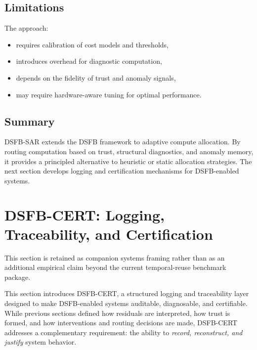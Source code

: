 \documentclass[11pt,letterpaper]{article}
\theoremstyle{gcresult}
\theoremstyle{definition}
\begin{document}

\subsection{Limitations}

The approach:
\begin{itemize}[leftmargin=1.5em]
    \item requires calibration of cost models and thresholds,
    \item introduces overhead for diagnostic computation,
    \item depends on the fidelity of trust and anomaly signals,
    \item may require hardware-aware tuning for optimal performance.
\end{itemize}


\subsection{Summary}

DSFB-SAR extends the DSFB framework to adaptive compute allocation. By routing computation based on trust, structural diagnostics, and anomaly memory, it provides a principled alternative to heuristic or static allocation strategies. The next section develops logging and certification mechanisms for DSFB-enabled systems.


\section{DSFB-CERT: Logging, Traceability, and Certification}

This section is retained as companion systems framing rather than as an additional empirical claim beyond the current temporal-reuse benchmark package.
\label{sec:cert}

This section introduces DSFB-CERT, a structured logging and traceability layer designed to make DSFB-enabled systems auditable, diagnosable, and certifiable. While previous sections defined how residuals are interpreted, how trust is formed, and how interventions and routing decisions are made, DSFB-CERT addresses a complementary requirement: the ability to \emph{record, reconstruct, and justify} system behavior.
\end{document}
